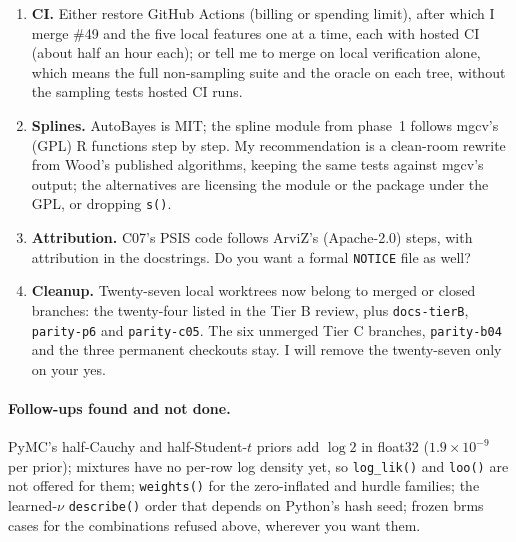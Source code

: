 \documentclass[11pt]{article}
\newcommand{\code}[1]{\texttt{#1}}
\newcommand{\file}[1]{\texttt{#1}}
\begin{document}
\begin{enumerate}
\item \textbf{CI.} Either restore GitHub Actions (billing or spending limit), after which I merge \#49 and the five
  local features one at a time, each with hosted CI (about half an hour each); or tell me to merge on local
  verification alone, which means the full non-sampling suite and the oracle on each tree, without the sampling tests
  hosted CI runs.
\item \textbf{Splines.} AutoBayes is MIT; the spline module from phase~1 follows mgcv's (GPL) R functions step by step.
  My recommendation is a clean-room rewrite from Wood's published algorithms, keeping the same tests against mgcv's
  output; the alternatives are licensing the module or the package under the GPL, or dropping \code{s()}.
\item \textbf{Attribution.} C07's PSIS code follows ArviZ's (Apache-2.0) steps, with attribution in the docstrings. Do
  you want a formal \file{NOTICE} file as well?
\item \textbf{Cleanup.} Twenty-seven local worktrees now belong to merged or closed branches: the twenty-four
  listed in the Tier B review, plus \file{docs-tierB}, \file{parity-p6} and \file{parity-c05}. The six unmerged Tier C
  branches, \file{parity-b04} and the three permanent checkouts stay. I will remove the twenty-seven only on your yes.
\end{enumerate}

\paragraph{Follow-ups found and not done.} PyMC's half-Cauchy and half-Student-$t$ priors add $\log 2$ in float32
($1.9\times10^{-9}$ per prior); mixtures have no per-row log density yet, so \code{log\_lik()} and \code{loo()} are not
offered for them; \code{weights()} for the zero-inflated and hurdle families; the learned-$\nu$ \code{describe()} order
that depends on Python's hash seed; frozen brms cases for the combinations refused above, wherever you want them.
\end{document}
